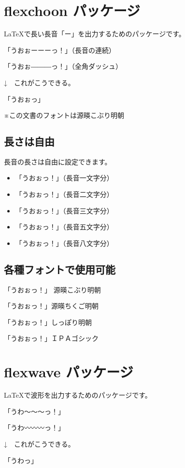 \documentclass[tate,
book,
paper=a6paper, %
onecolumn, %
fontsize=9pt, %
baselineskip=1.618zw, %
hanging_punctuation %
]{jlreq}
\begin{document}
\section{flexchoon パッケージ}

\LaTeX で長い長音「ー」を出力するためのパッケージです。

\vspace{0.5\baselineskip}

「うおぉーーーっ！」（長音の連続）

「うおぉ―――っ！」（全角ダッシュ）

↓　これがこうできる。

「うおぉっ」

{\footnotesize ※この文書のフォントは源暎こぶり明朝}

\vspace{0.5\baselineskip}

\subsection{長さは自由}

長音の長さは自由に設定できます。

\begin{itemize}
    \item 「うおぉっ！」（長音一文字分）
    \item 「うおぉっ！」（長音二文字分）
    \item 「うおぉっ！」（長音三文字分）
    \item 「うおぉっ！」（長音五文字分）
    \item 「うおぉっ！」（長音八文字分）
\end{itemize}

\subsection{各種フォントで使用可能}

{\fontKoburi「うおぉっ！」 源暎こぶり明朝}

{\fontChikugo「うおぉっ！」源暎ちくご明朝}

{\fontShippori「うおぉっ！」しっぽり明朝}

{\fontIPA「うおぉっ！」ＩＰＡゴシック}

\section{flexwave パッケージ}

\LaTeX で波形を出力するためのパッケージです。

「うわ〜〜〜っ！」

「うわ〰〰〰っ！」

↓　これがこうできる。

「うわっ」
\end{document}
